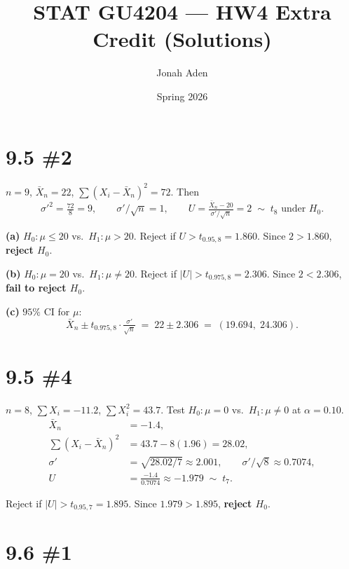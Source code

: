 \documentclass[11pt]{article}
\title{STAT GU4204 --- HW4 Extra Credit (Solutions)}
\author{Jonah Aden}
\date{Spring 2026}
\begin{document}
\maketitle

\bigskip

\section*{9.5 \#2}

$n = 9$, $\bar{X}_n = 22$, $\sum (X_i - \bar{X}_n)^2 = 72$. Then
\[
    \sigma'^{2} = \tfrac{72}{8} = 9, \qquad
    \sigma'/\sqrt{n} = 1, \qquad
    U = \tfrac{\bar{X}_n - 20}{\sigma'/\sqrt{n}} = 2 \;\sim\; t_8 \text{ under } H_0.
\]

\textbf{(a)} $H_0\!: \mu \le 20$ vs.\ $H_1\!: \mu > 20$.
Reject if $U > t_{0.95,8} = 1.860$. Since $2 > 1.860$, \textbf{reject $H_0$}.

\bigskip

\textbf{(b)} $H_0\!: \mu = 20$ vs.\ $H_1\!: \mu \neq 20$.
Reject if $|U| > t_{0.975,8} = 2.306$. Since $2 < 2.306$, \textbf{fail to reject $H_0$}.

\bigskip

\textbf{(c)} $95\%$ CI for $\mu$:
\[
    \bar{X}_n \pm t_{0.975,8}\cdot \tfrac{\sigma'}{\sqrt{n}}
    \;=\; 22 \pm 2.306
    \;=\; (19.694,\; 24.306).
\]

\bigskip
\bigskip

\section*{9.5 \#4}

$n = 8$, $\sum X_i = -11.2$, $\sum X_i^2 = 43.7$. Test $H_0\!: \mu = 0$ vs.\ $H_1\!: \mu \neq 0$ at $\alpha = 0.10$.
\begin{align*}
    \bar{X}_n &= -1.4, \\
    \sum (X_i - \bar{X}_n)^2 &= 43.7 - 8(1.96) = 28.02, \\
    \sigma' &= \sqrt{28.02/7} \approx 2.001, \qquad
    \sigma'/\sqrt{8} \approx 0.7074, \\
    U &= \tfrac{-1.4}{0.7074} \approx -1.979 \;\sim\; t_7.
\end{align*}

Reject if $|U| > t_{0.95,7} = 1.895$. Since $1.979 > 1.895$, \textbf{reject $H_0$}.

\bigskip
\bigskip

\section*{9.6 \#1}
\end{document}
